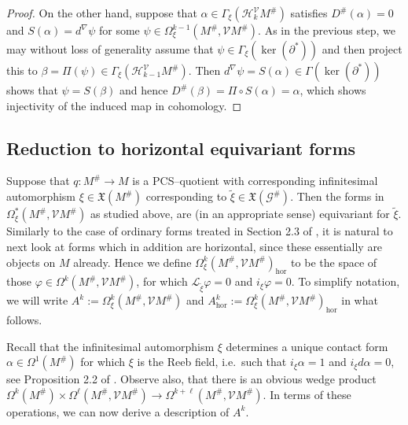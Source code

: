 \documentclass[12pt,a4paper]{amsart}
\def\frak{\mathfrak}
\def\Cal{\mathcal}
\let\phi\varphi
\newcommand{\x}{\times}
\renewcommand{\o}{\circ}
\newcommand{\al}{\alpha}
\newcommand{\be}{\beta}
\newcommand{\ph}{\phi}
\newcommand{\ps}{\psi}
\newcommand{\Ga}{\Gamma}
\newcommand{\Om}{\Omega}
\newcommand{\hor}{\text{hor}}
\numberwithin{theorem}{section}
\theoremstyle{definition}
\theoremstyle{remark}
\begin{document}
\begin{proof}
On the other hand, suppose that $\al\in\Ga_\xi(\Cal H_k^{\Cal V}M^\#)$
satisfies $D^\#(\al)=0$ and $S(\al)=d^\nabla\ps$ for some
$\ps\in\Om^{k-1}_\xi(M^\#,\Cal VM^\#)$. As in the previous step, we
may without loss of generality assume that
$\ps\in\Ga_\xi(\ker(\partial^*))$ and then project this to
$\be=\Pi(\ps)\in\Ga_\xi(\Cal H_{k-1}^{\Cal V}M^\#)$. Then
$d^\nabla\ps=S(\al)\in\Ga(\ker(\partial^*))$ shows that $\ps=S(\be)$
and hence $D^\#(\be)=\Pi\o S(\al)=\al$, which shows injectivity of the
induced map in cohomology.
\end{proof}

\subsection{Reduction to horizontal equivariant forms}\label{4.2}  
Suppose that $q:M^\#\to M$ is a PCS--quotient with corresponding
infinitesimal automorphism $\xi\in\frak X(M^\#)$ corresponding to
$\tilde\xi\in\frak X(\Cal G^\#)$. Then the forms in $\Om^*_\xi(M^\#,\Cal
VM^\#)$ as studied above, are (in an appropriate sense) equivariant
for $\tilde\xi$. Similarly to the case of ordinary forms treated in
Section 2.3 of \cite{Cap-Salac}, it is natural to next look at forms
which in addition are horizontal, since these essentially are objects
on $M$ already. Hence we define $\Om^k_\xi(M^\#,\Cal
VM^\#)_{\text{hor}}$ to be the space of those $\ph\in\Om^k(M^\#,\Cal
VM^\#)$, for which $\Cal L_{\tilde\xi}\ph=0$ and $i_\xi\ph=0$. To
simplify notation, we will write $A^k:=\Om^k_\xi(M^\#,\Cal VM^\#)$ and
$A^k_\hor:=\Om^k_\xi(M^\#,\Cal VM^\#)_{\text{hor}}$ in what follows.

Recall that the infinitesimal automorphism $\xi$ determines a unique
contact form $\al\in\Om^1(M^\#)$ for which $\xi$ is the Reeb field,
i.e.~such that $i_\xi\al=1$ and $i_\xi d\al=0$, see Proposition 2.2 of
\cite{Cap-Salac}. Observe also, that there is an obvious wedge product
$\Om^k(M^\#)\x\Om^\ell(M^\#,\Cal VM^\#)\to\Om^{k+\ell}(M^\#,\Cal
VM^\#)$. In terms of these operations, we can now derive a description
of $A^k$.
\end{document}
